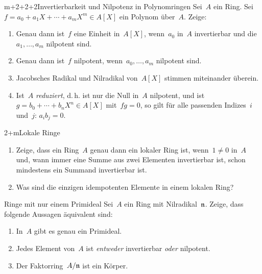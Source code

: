 \documentclass{uebblatt}
\begin{document}

\begin{aufgabe}{m+2+2+2}{Invertierbarkeit und Nilpotenz in Polynomringen}
Sei~$A$ ein Ring. Sei~$f = a_0 + a_1 X + \cdots + a_m X^m \in A[X]$ ein Polynom
über~$A$. Zeige:
\begin{enumerate}
\item Genau dann ist~$f$ eine Einheit in~$A[X]$, wenn~$a_0$ in~$A$ invertierbar
und die~$a_1,\ldots,a_m$ nilpotent sind.
\item Genau dann ist~$f$ nilpotent, wenn~$a_0,\ldots,a_m$ nilpotent sind.
\item Jacobsches Radikal und Nilradikal von~$A[X]$ stimmen miteinander überein.
\item Ist~$A$ \emph{reduziert}, d.\,h. ist nur die Null in~$A$ nilpotent,
und ist~$g = b_0 + \cdots + b_n X^n \in A[X]$ mit~$fg = 0$, so gilt für alle passenden Indizes~$i$ und~$j$: $a_i b_j = 0$.
\end{enumerate}
\end{aufgabe}

\begin{aufgabe}{2+m}{Lokale Ringe}
\begin{enumerate}
\item Zeige, dass ein Ring~$A$ genau dann ein lokaler Ring ist,
wenn~$1 \neq 0$ in~$A$ und, wann immer eine Summe aus zwei Elementen
invertierbar ist, schon mindestens ein Summand invertierbar ist.
\item Was sind die einzigen idempotenten Elemente in einem lokalen Ring?
\end{enumerate}
\end{aufgabe}

\begin{aufgabe}{4}{Ringe mit nur einem Primideal}
Sei~$A$ ein Ring mit Nilradikal~$\mathfrak{n}$. Zeige, dass folgende
Aussagen äquivalent sind:
\begin{enumerate}
\item[1.] In~$A$ gibt es genau ein Primideal.
\item[2.] Jedes Element von~$A$ ist \emph{entweder} invertierbar \emph{oder}
nilpotent.
\item[3.] Der Faktorring~$A/\mathfrak{n}$ ist ein Körper.
\end{enumerate}
\end{aufgabe}
\end{document}
